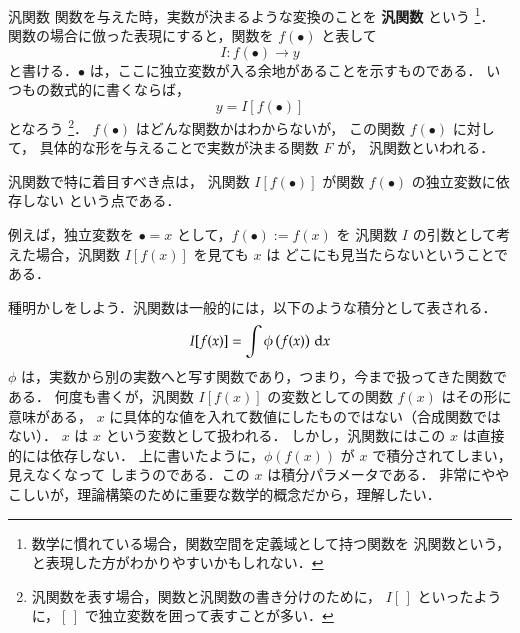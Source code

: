                 \begin{mysmallsec}{汎関数}
                    関数を与えた時，実数が決まるような変換のことを \textbf{汎関数} という
                        \footnote{
                            数学に慣れている場合，関数空間を定義域として持つ関数を
                            汎関数という，と表現した方がわかりやすいかもしれない．
                        }．
                    関数の場合に倣った表現にすると，関数を $f(\bullet)$ と表して
                        \begin{equation*}
                            I:f(\bullet) \to y
                        \end{equation*}
                    と書ける．$\bullet$ は，ここに独立変数が入る余地があることを示すものである．
                    いつもの数式的に書くならば，
                        \begin{equation*}
                            y = I[f(\bullet)]
                        \end{equation*}
                    となろう
                        \footnote{
                            汎関数を表す場合，関数と汎関数の書き分けのために，
                            $I[\,]$ といったように，$[\,]$ で独立変数を囲って表すことが多い．
                        }．
                    $f(\bullet)$ はどんな関数かはわからないが，
                    この関数 $f(\bullet)$ に対して，
                    具体的な形を与えることで実数が決まる関数 $F$ が，
                    汎関数といわれる．

                    汎関数で特に着目すべき点は，
                    汎関数 $I[f(\bullet)]$ が関数 $f(\bullet)$ の独立変数に依存しない
                    という点である．

                    例えば，独立変数を $\bullet = x$ として，$f(\bullet) := f(x)$ を
                    汎関数 $I$ の引数として考えた場合，汎関数 $I[f(x)]$ を見ても $x$ は
                    どこにも見当たらないということである．

                    種明かしをしよう．汎関数は一般的には，以下のような積分として表される．
                        \begin{equation*}
                            I[f(x)] = \int \phi\left( f(x) \right) \,\mathrm{d} x
                        \end{equation*}
                    $\phi$ は，実数から別の実数へと写す関数であり，つまり，今まで扱ってきた関数である．
                    何度も書くが，汎関数 $I[f(x)]$ の変数としての関数 $f(x)$ はその形に意味がある，
                    $x$ に具体的な値を入れて数値にしたものではない（合成関数ではない）．
                    $x$ は $x$ という変数として扱われる．
                    しかし，汎関数にはこの $x$ は直接的には依存しない．
                    上に書いたように，$\phi(f(x))$ が $x$ で積分されてしまい，見えなくなって
                    しまうのである．この $x$ は積分パラメータである．
                    非常にややこしいが，理論構築のために重要な数学的概念だから，理解したい．
                \end{mysmallsec}

